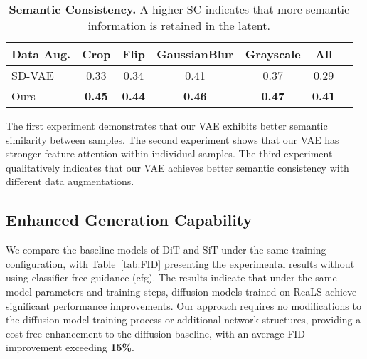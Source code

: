 \begin{table}[ht]
\vskip -0.1in
\centering
\setlength{\tabcolsep}{5pt}
\small %
\caption{\textbf{Semantic Consistency.} A higher SC indicates that more semantic information is retained in the latent.}
\begin{tabular}{l|cccccc}
\toprule
Data Aug. & Crop          & Flip          & GaussianBlur  & Grayscale     & All            \\ \midrule
SD-VAE    & 0.33          & 0.34          & 0.41          & 0.37          & 0.29           \\
Ours      & \textbf{0.45} & \textbf{0.44} & \textbf{0.46} & \textbf{0.47} &  \textbf{0.41} \\
\bottomrule
\end{tabular}
\label{tab: Semantic consistency}
\end{table}

The first experiment demonstrates that our VAE exhibits better semantic similarity between samples. The second experiment shows that our VAE has stronger feature attention within individual samples. The third experiment qualitatively indicates that our VAE achieves better semantic consistency with different data augmentations.

\subsection{Enhanced Generation Capability}

We compare the baseline models of DiT and SiT under the same training configuration, with Table~\ref{tab:FID} presenting the experimental results without using classifier-free guidance (cfg). The results indicate that under the same model parameters and training steps, diffusion models trained on ReaLS achieve significant performance improvements. Our approach requires no modifications to the diffusion model training process or additional network structures, providing a cost-free enhancement to the diffusion baseline, with an average FID improvement exceeding \textbf{15\%}.


